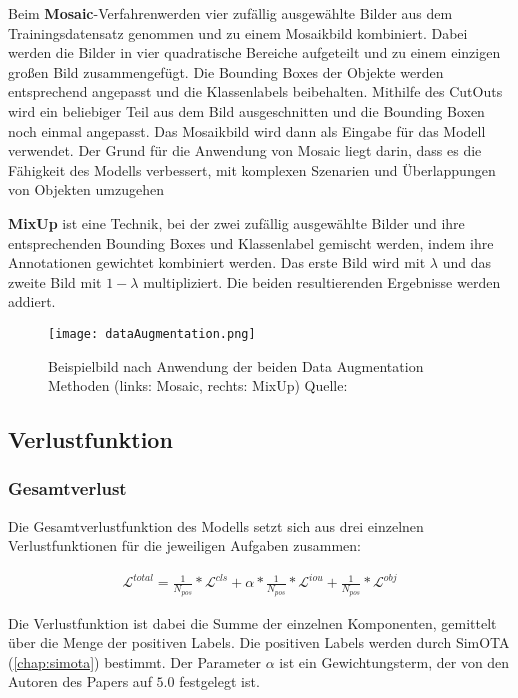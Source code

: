 Beim \textbf{Mosaic}-Verfahrenwerden vier zufällig ausgewählte Bilder aus dem Trainingsdatensatz genommen und zu einem Mosaikbild kombiniert. Dabei werden die Bilder in vier quadratische Bereiche aufgeteilt und zu einem einzigen großen Bild zusammengefügt. Die Bounding Boxes der Objekte werden entsprechend angepasst und die Klassenlabels beibehalten. Mithilfe des CutOuts wird ein beliebiger Teil aus dem Bild ausgeschnitten und die Bounding Boxen noch einmal angepasst. Das Mosaikbild wird dann als Eingabe für das Modell verwendet. Der Grund für die Anwendung von Mosaic liegt darin, dass es die Fähigkeit des Modells verbessert, mit komplexen Szenarien und Überlappungen von Objekten umzugehen

\textbf{MixUp} ist eine Technik, bei der zwei zufällig ausgewählte Bilder und ihre entsprechenden Bounding Boxes und Klassenlabel gemischt werden, indem ihre Annotationen gewichtet kombiniert werden. Das erste Bild wird mit $\lambda$ und das zweite Bild mit $1-\lambda$ multipliziert. Die beiden resultierenden Ergebnisse werden addiert. \cite{yoloxExplanationAug}

\begin{figure}[h]
	\centering
	\texttt{[image: dataAugmentation.png]}
	\caption[Beispielbild nach Anwendung der beiden Data Augmentation Methoden]{Beispielbild nach Anwendung der beiden Data Augmentation Methoden (links: Mosaic, rechts: MixUp) Quelle: \cite{yoloxExplanationAug}}
	\label{fig:yoloxExplanationAug}
\end{figure}



\subsection{Verlustfunktion}
\subsubsection{Gesamtverlust}
Die Gesamtverlustfunktion des Modells setzt sich aus drei einzelnen Verlustfunktionen für die jeweiligen Aufgaben zusammen:

\begin{align}
	\mathcal{L}^{total}=\frac{1}{N_{pos}}*\mathcal{L}^{cls}+\alpha*\frac{1}{N_{pos}}*	\mathcal{L}^{iou}+	\frac{1}{N_{pos}}*\mathcal{L}^{obj}
\end{align}

Die Verlustfunktion ist dabei die Summe der einzelnen Komponenten, gemittelt über die Menge der positiven Labels. Die positiven Labels werden durch SimOTA (\ref{chap:simota}) bestimmt. Der Parameter $\alpha$ ist ein Gewichtungsterm, der von den Autoren des Papers auf $5.0$ festgelegt ist.

